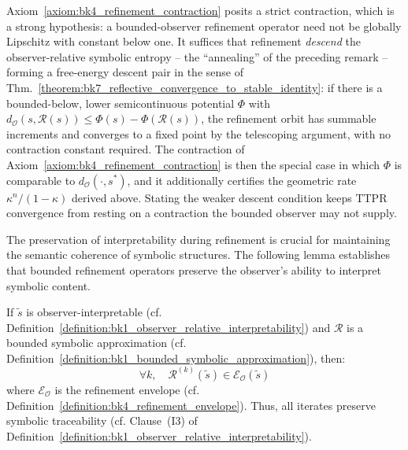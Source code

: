 \begin{remark}
\label{remark:bk4_ttpr_descent_route}
Axiom~\ref{axiom:bk4_refinement_contraction} posits a strict contraction, which is a
strong hypothesis: a bounded-observer refinement operator need not be globally
Lipschitz with constant below one. It suffices that refinement \emph{descend} the
observer-relative symbolic entropy -- the ``annealing'' of the preceding remark --
forming a free-energy descent pair in the sense of
Thm.~\ref{theorem:bk7_reflective_convergence_to_stable_identity}: if there is a
bounded-below, lower semicontinuous potential $\Phi$ with
$d_{\mathcal{O}}(s, \mathcal{R}(s)) \le \Phi(s) - \Phi(\mathcal{R}(s))$, the refinement
orbit has summable increments and converges to a fixed point by the telescoping
argument, with no contraction constant required. The contraction of
Axiom~\ref{axiom:bk4_refinement_contraction} is then the special case in which $\Phi$
is comparable to $d_{\mathcal{O}}(\cdot, s^*)$, and it additionally certifies the
geometric rate $\kappa^{n}/(1-\kappa)$ derived above. Stating the weaker descent
condition keeps TTPR convergence from resting on a contraction the bounded observer
may not supply.
\end{remark}

The preservation of interpretability during refinement is crucial for maintaining the semantic coherence of symbolic structures. The following lemma establishes that bounded refinement operators preserve the observer's ability to interpret symbolic content.

\begin{lemma}
\label{lemma:bk4_ttpr_interpretability_preserved}
If $\tilde{s}$ is observer-interpretable (cf. Definition~\ref{definition:bk1_observer_relative_interpretability}) and $\mathcal{R}$ is a bounded symbolic approximation (cf. Definition~\ref{definition:bk1_bounded_symbolic_approximation}), then:
\[
\forall k,\quad \mathcal{R}^{(k)}(\tilde{s}) \in \mathcal{E}_{\mathcal{O}}(\tilde{s})
\]
where $\mathcal{E}_{\mathcal{O}}$ is the refinement envelope (cf. Definition~\ref{definition:bk4_refinement_envelope}). Thus, all iterates preserve symbolic traceability (cf. Clause~(I3) of Definition~\ref{definition:bk1_observer_relative_interpretability}).
\end{lemma}

